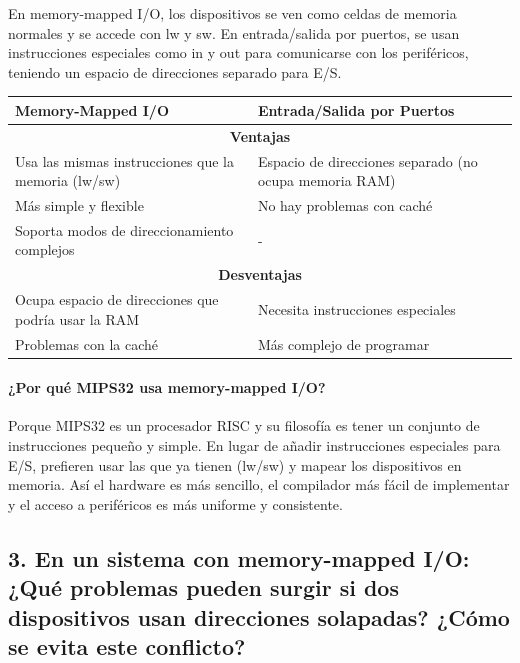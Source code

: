 \documentclass[12pt]{article}
\begin{document}
En memory-mapped I/O, los dispositivos se ven como celdas de memoria normales y se accede con lw y sw. En entrada/salida por puertos, se usan instrucciones especiales como in y out para comunicarse con los periféricos, teniendo un espacio de direcciones separado para E/S.

\vspace{0.3cm}

\begin{center}
\begin{tabular}{|p{5.5cm}|p{5.5cm}|}
\hline
\textbf{Memory-Mapped I/O} & \textbf{Entrada/Salida por Puertos} \\ \hline
\multicolumn{2}{|c|}{\textbf{Ventajas}} \\ \hline
Usa las mismas instrucciones que la memoria (lw/sw) & Espacio de direcciones separado (no ocupa memoria RAM) \\
Más simple y flexible & No hay problemas con caché \\
Soporta modos de direccionamiento complejos & - \\ \hline
\multicolumn{2}{|c|}{\textbf{Desventajas}} \\ \hline
Ocupa espacio de direcciones que podría usar la RAM & Necesita instrucciones especiales \\
Problemas con la caché & Más complejo de programar \\ \hline
\end{tabular}
\end{center}

\vspace{0.3cm}

\paragraph*{¿Por qué MIPS32 usa memory-mapped I/O?}

Porque MIPS32 es un procesador RISC y su filosofía es tener un conjunto de instrucciones pequeño y simple. En lugar de añadir instrucciones especiales para E/S, prefieren usar las que ya tienen (lw/sw) y mapear los dispositivos en memoria. Así el hardware es más sencillo, el compilador más fácil de implementar y el acceso a periféricos es más uniforme y consistente.

\subsection*{3. En un sistema con memory-mapped I/O: ¿Qué problemas pueden surgir si dos dispositivos usan direcciones solapadas? ¿Cómo se evita este conflicto?}
\end{document}
